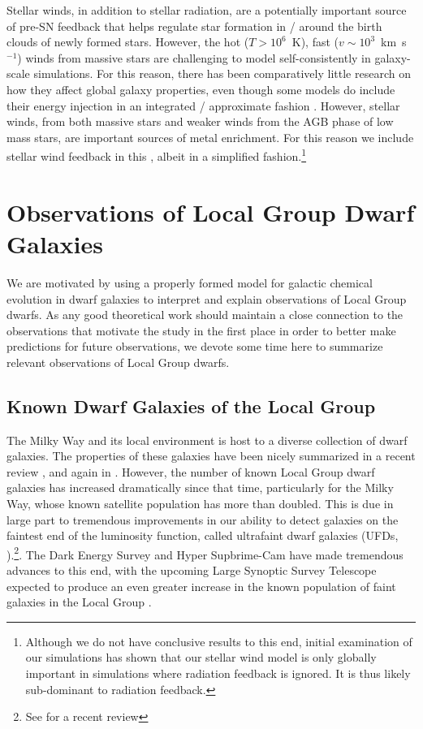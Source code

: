 Stellar winds, in addition to stellar radiation, are a potentially important source of pre-SN feedback that helps regulate star formation in / around the birth clouds of newly formed stars. However, the hot ($T>10^{6}$~K), fast ($v \sim 10^{3}$~km~s$^{-1}$) winds from massive stars \citep{Weaver1977} are challenging to model self-consistently in galaxy-scale simulations. For this reason, there has been comparatively little research on how they affect global galaxy properties, even though some models do include their energy injection in an integrated / approximate fashion \citep[e.g.][]{FIRE}. However, stellar winds, from both massive stars and weaker winds from the AGB phase of low mass stars, are important sources of metal enrichment. For this reason we include stellar wind feedback in this \dissertation, albeit in a simplified fashion.\footnote{Although we do not have conclusive results to this end, initial examination of our simulations has shown that our stellar wind model is only globally important in simulations where radiation feedback is ignored. It is thus likely sub-dominant to radiation feedback.}

\section{Observations of Local Group Dwarf Galaxies}
\label{intro:sec:LG dwarfs}

We are motivated by using a properly formed model for galactic chemical evolution in dwarf galaxies to interpret and explain observations of Local Group dwarfs. As any good theoretical work should maintain a close connection to the observations that motivate the study in the first place in order to better make predictions for future observations, we devote some time here to summarize relevant observations of Local Group dwarfs.

\subsection{Known Dwarf Galaxies of the Local Group}
\label{intro:sec:dwarf galaxies}

The Milky Way and its local environment is host to a diverse collection of dwarf galaxies. The properties of these galaxies have been nicely summarized in a recent review \citep{Tolstoy2009}, and again in \cite{McConnachie2012}. However, the number of known Local Group dwarf galaxies has increased dramatically since that time, particularly for the Milky Way, whose known satellite population has more than doubled. This is due in large part to tremendous improvements in our ability to detect galaxies on the faintest end of the luminosity function, called ultrafaint dwarf galaxies (UFDs, \cite{Willman2005}).\footnote{See \cite{Simon2019} for a recent review}. The Dark Energy Survey \citep[e.g.][]{Drlica-Wagner2015} and Hyper Supbrime-Cam \citep[e.g.][]{Greco2018} have made tremendous advances to this end, with the upcoming Large Synoptic Survey Telescope expected to produce an even greater increase in the known population of faint galaxies in the Local Group \citep{Haynes2019,Weisz2019}.

